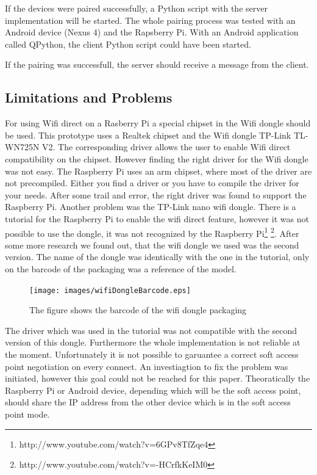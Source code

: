 \noindent If the devices were paired successfully, a Python script with the server implementation will be started.
The whole pairing process was tested with an Android device (Nexus 4) and the Rapsberry Pi. With an Android application called QPython, the client Python script could have been started.

If the pairing was successfull, the server should receive a message from the client.

\subsection*{Limitations and Problems}
\label{subsec:RaspberryLimitationsProblems}
For using Wifi direct on a Rasberry Pi a special chipset in the Wifi dongle should be used. This prototype uses a Realtek chipset and the Wifi dongle TP-Link TL-WN725N V2. The corresponding driver allows the user to enable Wifi direct compatibility on the chipset. However finding the right driver for the Wifi dongle was not easy. The Raspberry Pi uses an arm chipset, where most of the driver are not precompiled. Either you find a driver or you have to compile the driver for your needs. After some trail and error, the right driver was found to support the Raspberry Pi. Another problem was the TP-Link nano wifi dongle. There is  a tutorial for the Raspberry Pi to enable the wifi direct feature, however it was not possible to use the dongle, it was not recognized by the Raspberry Pi\footnote{http://www.youtube.com/watch?v=6GPv8TfZqe4} \footnote{http://www.youtube.com/watch?v=-HCrfkKeIM0}. After some more research we found out, that the wifi dongle we used was the second version\cite{wifidongleV2}. The name of the dongle was identically with the one in the tutorial, only on the barcode of the packaging was a reference of the model.

\begin{figure}[!hb]
	\centering
  \texttt{[image: images/wifiDongleBarcode.eps]}
	\caption{The figure shows the barcode of the wifi dongle packaging}
	\label{fig1}
\end{figure}

\noindent The driver which was used in the tutorial was not compatible with the second version of this dongle. Furthermore the whole implementation is not reliable at the moment. Unfortunately it is not possible to garuantee a correct soft access point negotiation on every connect. An investiagtion to fix the problem was initiated, however this goal could not be reached for this paper. Theoratically the Raspberry Pi or Android device, depending which will be the soft access point, should share the IP address from the other device which is in the soft access point mode.


